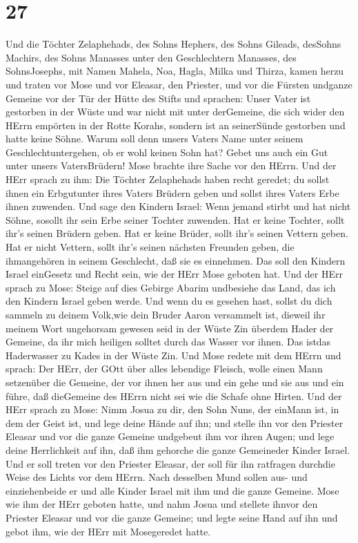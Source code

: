 \hypertarget{section-26}{%
\section{27}\label{section-26}}

 Und die Töchter Zelaphehads, des Sohns Hephers, des Sohns
Gileads, desSohns Machirs, des Sohns Manasses unter den Geschlechtern
Manasses, des SohnsJosephs, mit Namen Mahela, Noa, Hagla, Milka und
Thirza, kamen herzu  und traten vor Mose und vor Eleasar,
den Priester, und vor die Fürsten undganze Gemeine vor der Tür der Hütte
des Stifts und sprachen:  Unser Vater ist gestorben in der
Wüste und war nicht mit unter derGemeine, die sich wider den HErrn
empörten in der Rotte Korahs, sondern ist an seinerSünde gestorben und
hatte keine Söhne.  Warum soll denn unsers Vaters Name unter
seinem Geschlechtuntergehen, ob er wohl keinen Sohn hat? Gebet uns auch
ein Gut unter unsers VatersBrüdern!  Mose brachte ihre Sache
vor den HErrn.  Und der HErr sprach zu ihm:  Die
Töchter Zelaphehads haben recht geredet; du sollst ihnen ein Erbgutunter
ihres Vaters Brüdern geben und sollst ihres Vaters Erbe ihnen zuwenden.
 Und sage den Kindern Israel: Wenn jemand stirbt und hat
nicht Söhne, sosollt ihr sein Erbe seiner Tochter zuwenden. 
Hat er keine Tochter, sollt ihr's seinen Brüdern geben. 
Hat er keine Brüder, sollt ihr's seinen Vettern geben.  Hat
er nicht Vettern, sollt ihr's seinen nächsten Freunden geben, die
ihmangehören in seinem Geschlecht, daß sie es einnehmen. Das soll den
Kindern Israel einGesetz und Recht sein, wie der HErr Mose geboten hat.
 Und der HErr sprach zu Mose: Steige auf dies Gebirge
Abarim undbesiehe das Land, das ich den Kindern Israel geben werde.
 Und wenn du es gesehen hast, sollst du dich sammeln zu
deinem Volk,wie dein Bruder Aaron versammelt ist,  dieweil
ihr meinem Wort ungehorsam gewesen seid in der Wüste Zin überdem Hader
der Gemeine, da ihr mich heiligen solltet durch das Wasser vor ihnen.
Das istdas Haderwasser zu Kades in der Wüste Zin.  Und Mose
redete mit dem HErrn und sprach:  Der HErr, der GOtt über
alles lebendige Fleisch, wolle einen Mann setzenüber die Gemeine,
 der vor ihnen her aus und ein gehe und sie aus und ein
führe, daß dieGemeine des HErrn nicht sei wie die Schafe ohne Hirten.
 Und der HErr sprach zu Mose: Nimm Josua zu dir, den Sohn
Nuns, der einMann ist, in dem der Geist ist, und lege deine Hände auf
ihn;  und stelle ihn vor den Priester Eleasar und vor die
ganze Gemeine undgebeut ihm vor ihren Augen;  und lege
deine Herrlichkeit auf ihn, daß ihm gehorche die ganze Gemeineder Kinder
Israel.  Und er soll treten vor den Priester Eleasar, der
soll für ihn ratfragen durchdie Weise des Lichts vor dem HErrn. Nach
desselben Mund sollen aus- und einziehenbeide er und alle Kinder Israel
mit ihm und die ganze Gemeine.  Mose wie ihm der HErr
geboten hatte, und nahm Josua und stellete ihnvor den Priester Eleasar
und vor die ganze Gemeine;  und legte seine Hand auf ihn
und gebot ihm, wie der HErr mit Mosegeredet hatte.

